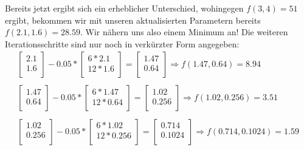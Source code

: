   Bereits jetzt ergibt sich ein erheblicher Unterschied, wohingegen $f(3,4) = 51$ ergibt, bekommen wir mit unseren aktualisierten Parametern bereits 
  $f(2.1, 1.6) = 28.59$. Wir nähern uns also einem Minimum an! Die weiteren Iterationsschritte sind nur noch in verkürzter Form angegeben:
  \begin{align*}
    \begin{bmatrix}
      2.1\\
      1.6\\
    \end{bmatrix} - 0.05 * \begin{bmatrix}
      6 * 2.1\\
      12 * 1.6\\
    \end{bmatrix} = \begin{bmatrix}
      1.47\\
      0.64\\
    \end{bmatrix} \Rightarrow f(1.47, 0.64) = 8.94
    \\\\
    \begin{bmatrix}
      1.47\\
      0.64\\
    \end{bmatrix} - 0.05 * \begin{bmatrix}
      6 * 1.47\\
      12 * 0.64\\
    \end{bmatrix} = \begin{bmatrix}
      1.02\\
      0.256\\
    \end{bmatrix} \Rightarrow f(1.02, 0.256) = 3.51
    \\\\
    \begin{bmatrix}
      1.02\\
      0.256\\
    \end{bmatrix} - 0.05 * \begin{bmatrix}
      6 * 1.02\\
      12 * 0.256\\
    \end{bmatrix} = \begin{bmatrix}
      0.714\\
      0.1024\\
    \end{bmatrix} \Rightarrow f(0.714, 0.1024) = 1.59

\end{align*}
